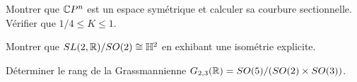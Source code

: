 \begin{exercice}
Montrer que $\mathbb{C} P^n$ est un espace sym\'etrique et calculer sa courbure sectionnelle.
V\'erifier que $1/4 \leq K \leq 1$.
\end{exercice}

\begin{exercice}
Montrer que $SL(2,\mathbb{R})/SO(2) \cong \mathbb{H}^2$ en exhibant une isom\'etrie explicite.
\end{exercice}

\begin{exercice}
D\'eterminer le rang de la Grassmannienne $G_{2,3}(\mathbb{R}) = SO(5)/(SO(2) \times SO(3))$.
\end{exercice}
